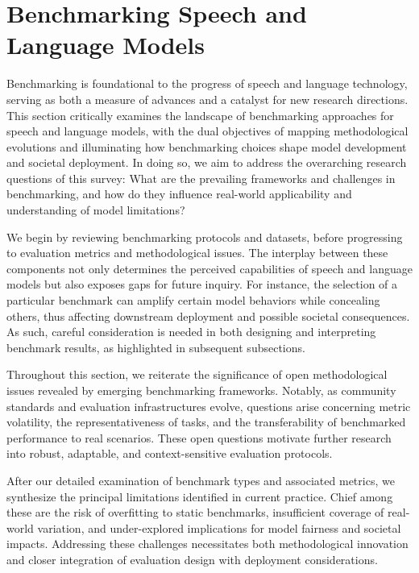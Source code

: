 \documentclass[sigconf]{acmart}
\begin{document}
\section{Benchmarking Speech and Language Models}

Benchmarking is foundational to the progress of speech and language technology, serving as both a measure of advances and a catalyst for new research directions. This section critically examines the landscape of benchmarking approaches for speech and language models, with the dual objectives of mapping methodological evolutions and illuminating how benchmarking choices shape model development and societal deployment. In doing so, we aim to address the overarching research questions of this survey: What are the prevailing frameworks and challenges in benchmarking, and how do they influence real-world applicability and understanding of model limitations?

We begin by reviewing benchmarking protocols and datasets, before progressing to evaluation metrics and methodological issues. The interplay between these components not only determines the perceived capabilities of speech and language models but also exposes gaps for future inquiry. For instance, the selection of a particular benchmark can amplify certain model behaviors while concealing others, thus affecting downstream deployment and possible societal consequences. As such, careful consideration is needed in both designing and interpreting benchmark results, as highlighted in subsequent subsections.

Throughout this section, we reiterate the significance of open methodological issues revealed by emerging benchmarking frameworks. Notably, as community standards and evaluation infrastructures evolve, questions arise concerning metric volatility, the representativeness of tasks, and the transferability of benchmarked performance to real scenarios. These open questions motivate further research into robust, adaptable, and context-sensitive evaluation protocols.

After our detailed examination of benchmark types and associated metrics, we synthesize the principal limitations identified in current practice. Chief among these are the risk of overfitting to static benchmarks, insufficient coverage of real-world variation, and under-explored implications for model fairness and societal impacts. Addressing these challenges necessitates both methodological innovation and closer integration of evaluation design with deployment considerations.
\end{document}
